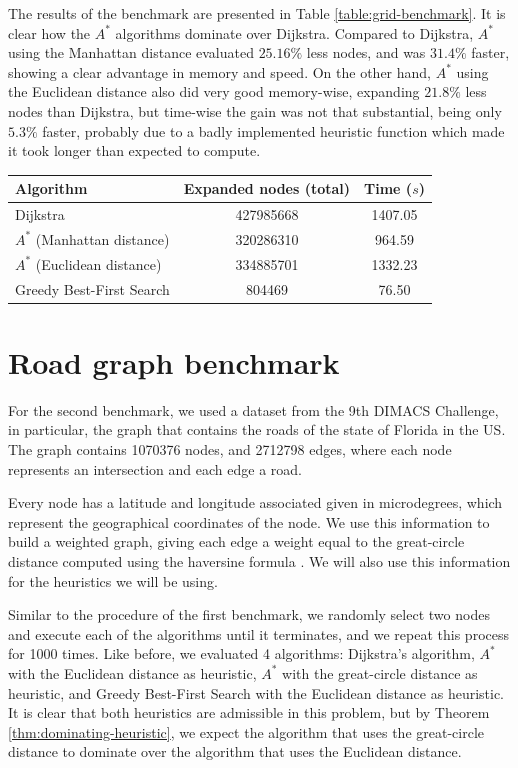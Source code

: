 \documentclass[a4paper,10pt]{report}
\begin{document}
The results of the benchmark are presented in Table \ref{table:grid-benchmark}. It is clear how the $A^*$ algorithms dominate over Dijkstra. Compared to Dijkstra, $A^*$ using the Manhattan distance evaluated $25.16\%$ less nodes, and was $31.4\%$ faster, showing a clear advantage in memory and speed. On the other hand, $A^*$ using the Euclidean distance also did very good memory-wise, expanding $21.8\%$ less nodes than Dijkstra, but time-wise the gain was not that substantial, being only $5.3\%$ faster, probably due to a badly implemented heuristic function which made it took longer than expected to compute.

\begin{center}
	\begin{tabular}{lcc}
	\label{table:grid-benchmark}
	Algorithm & Expanded nodes (total) & Time ($s$)  \\
	\hline
	Dijkstra & 427985668 & 1407.05 \\
	$A^*$ (Manhattan distance) & 320286310 & 964.59 \\
	$A^*$ (Euclidean distance) & 334885701 & 1332.23 \\
	Greedy Best-First Search & 804469 & 76.50 \\
	\end{tabular}
\end{center}


\section{Road graph benchmark}

For the second benchmark, we used a dataset from the 9th DIMACS Challenge\cite{dimacs}, in particular, the graph that contains the roads of the state of Florida in the US. The graph contains 1070376 nodes, and 2712798 edges, where each node represents an intersection and each edge a road.

Every node has a latitude and longitude associated given in microdegrees, which represent the geographical coordinates of the node. We use this information to build a weighted graph, giving each edge a weight equal to the great-circle distance computed using the haversine formula \cite{haversine}. We will also use this information for the heuristics we will be using.

Similar to the procedure of the first benchmark, we randomly select two nodes and execute each of the algorithms until it terminates, and we repeat this process for 1000 times. Like before, we evaluated 4 algorithms: Dijkstra's algorithm, $A^*$ with the Euclidean distance as heuristic, $A^*$ with the great-circle distance as heuristic, and Greedy Best-First Search with the Euclidean distance as heuristic. It is clear that both heuristics are admissible in this problem, but by Theorem \ref{thm:dominating-heuristic}, we expect the algorithm that uses the great-circle distance to dominate over the algorithm that uses the Euclidean distance.
\end{document}
